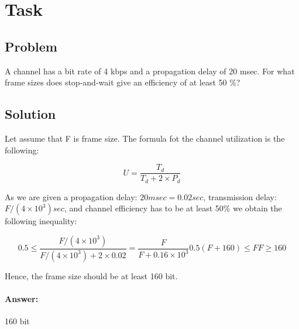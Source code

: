 \documentclass[12pt]{article}
\begin{document}
    \section{Task}\label{sec:task-2}

    \subsection{Problem}
        A channel has a bit rate of 4 kbps and a propagation delay of 20 msec.
        For what frame sizes does stop-and-wait give an efficiency of at least 50 $\%$?

        \subsection{Solution}
        Let assume that F is frame size.
        The formula fot the channel utilization is the following:

        \begin{equation}
            U = \frac{T_d}{T_d + 2 \times P_d}
        \end{equation}

        As we are given a propagation delay: $20 msec = 0.02sec$, transmission delay: $F/(4\times10^3)sec$,
        and channel efficiency has to be at least 50$\%$ we obtain the following inequality:

        \begin{subequations}
            \begin{equation}
                0.5 \leq \frac{F/(4\times10^3)}{F/(4\times10^3) + 2 \times 0.02} = \frac{F}{F + 0.16 \times 10^3}
            \end{equation}

            \begin{equation}
                0.5(F + 160) \leq F
            \end{equation}

            \begin{equation}
                F \geq 160
            \end{equation}
        \end{subequations}

        Hence, the frame size should be at least 160 bit.

        \paragraph{Answer:} 160 bit
    \newpage
\end{document}
